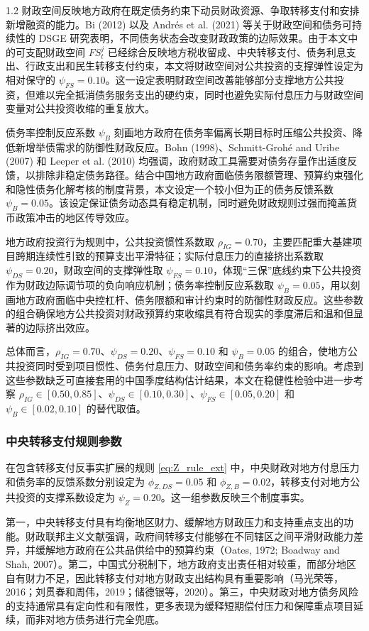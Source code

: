 \documentclass[12pt,UTF8]{ctexart}
\begin{document}
\begin{spacing}{1.2}
		财政空间反映地方政府在既定债务约束下动员财政资源、争取转移支付和安排新增融资的能力。Bi (2012) 以及 Andrés et al. (2021) 等关于财政空间和债务可持续性的 DSGE 研究表明，不同债务状态会改变财政政策的边际效果。由于本文中的可支配财政空间 $FS_t^j$ 已经综合反映地方税收留成、中央转移支付、债务利息支出、行政支出和民生转移支付约束，本文将财政空间对公共投资的支撑弹性设定为相对保守的 $\psi_{FS}=0.10$。这一设定表明财政空间改善能够部分支撑地方公共投资，但难以完全抵消债务服务支出的硬约束，同时也避免实际付息压力与财政空间变量对公共投资收缩的重复放大。
		
		债务率控制反应系数 $\psi_B$ 刻画地方政府在债务率偏离长期目标时压缩公共投资、降低新增举债需求的防御性财政反应。Bohn (1998)、Schmitt-Grohé and Uribe (2007) 和 Leeper et al. (2010) 均强调，政府财政工具需要对债务存量作出适度反馈，以排除非稳定债务路径。结合中国地方政府面临债务限额管理、预算约束强化和隐性债务化解考核的制度背景，本文设定一个较小但为正的债务反馈系数 $\psi_B=0.05$。该设定保证债务动态具有稳定机制，同时避免财政规则过强而掩盖货币政策冲击的地区传导效应。
		
		地方政府投资行为规则中，公共投资惯性系数取 $\rho_{IG}=0.70$，主要匹配重大基建项目跨期连续性引致的预算支出平滑特征；实际付息压力的直接挤出系数取 $\psi_{DS}=0.20$，财政空间的支撑弹性取 $\psi_{FS}=0.10$，体现“三保”底线约束下公共投资作为财政边际调节项的负向响应机制；债务率控制反应系数取 $\psi_B=0.05$，用以刻画地方政府面临中央控杠杆、债务限额和审计约束时的防御性财政反应。这些参数的组合确保地方公共投资对财政预算约束收缩具有符合现实的季度滞后和温和但显著的边际挤出效应。
		
		总体而言，$\rho_{IG}=0.70$、$\psi_{DS}=0.20$、$\psi_{FS}=0.10$ 和 $\psi_B=0.05$ 的组合，使地方公共投资同时受到项目惯性、债务付息压力、财政空间和债务率约束的影响。考虑到这些参数缺乏可直接套用的中国季度结构估计结果，本文在稳健性检验中进一步考察 $\rho_{IG}\in[0.50,0.85]$、$\psi_{DS}\in[0.10,0.30]$、$\psi_{FS}\in[0.05,0.20]$ 和 $\psi_B\in[0.02,0.10]$ 的替代取值。
		
		\subsubsection{中央转移支付规则参数}
		
		在包含转移支付反事实扩展的规则 \eqref{eq:Z_rule_ext} 中，中央财政对地方付息压力和债务率的反馈系数分别设定为 $\phi_{Z,DS}=0.05$ 和 $\phi_{Z,B}=0.02$，转移支付对地方公共投资的支撑系数设定为 $\psi_Z=0.20$。这一组参数反映三个制度事实。
		
		第一，中央转移支付具有均衡地区财力、缓解地方财政压力和支持重点支出的功能。财政联邦主义文献强调，政府间转移支付能够在不同辖区之间平滑财政能力差异，并缓解地方政府在公共品供给中的预算约束（Oates, 1972; Boadway and Shah, 2007）。第二，中国式分税制下，地方政府支出责任相对较重，而部分地区自有财力不足，因此转移支付对地方财政支出结构具有重要影响（马光荣等，2016；刘贯春和周伟，2019；储德银等，2020）。第三，中央财政对地方债务风险的支持通常具有定向性和有限性，更多表现为缓释短期偿付压力和保障重点项目延续，而非对地方债务进行完全兜底。
		

\end{spacing}
\end{document}
